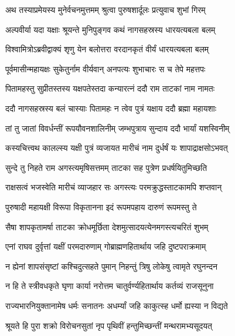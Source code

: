 
\twolineshloka
{अथ तस्याप्रमेयस्य मुनेर्वचनमुत्तमम्}
{श्रुत्वा पुरुषशार्दूलः प्रत्युवाच शुभां गिरम्} %

\twolineshloka
{अल्पवीर्या यदा यक्षाः श्रूयन्ते मुनिपुङ्गव}
{कथं नागसहस्रस्य धारयत्यबला बलम्} %

\twolineshloka
{विश्वामित्रोऽब्रवीद्वाक्यं शृणु येन बलोत्तरा}
{वरदानकृतं वीर्यं धारयत्यबला बलम्} %

\twolineshloka
{पूर्वमासीन्महायक्षः सुकेतुर्नाम वीर्यवान्}
{अनपत्यः शुभाचारः स च तेपे महत्तपः} %

\twolineshloka
{पितामहस्तु सुप्रीतस्तस्य यक्षपतेस्तदा}
{कन्यारत्नं ददौ राम ताटकां नाम नामतः} %

\twolineshloka
{ददौ नागसहस्रस्य बलं चास्याः पितामहः}
{न त्वेव पुत्रं यक्षाय ददौ ब्रह्मा महायशाः} %

\twolineshloka
{तां तु जातां विवर्धन्तीं रूपयौवनशालिनीम्}
{जम्भपुत्राय सुन्दाय ददौ भार्यां यशस्विनीम्} %

\twolineshloka
{कस्यचित्त्वथ कालल्स्य यक्षी पुत्रं व्यजायत}
{मारीचं नाम दुर्धर्षं यः शापाद्राक्षसोऽभवत्} %

\twolineshloka
{सुन्दे तु निहते राम अगस्त्यमृषिसत्तमम्}
{ताटका सह पुत्रेण प्रधर्षयितुमिच्छति} %

\twolineshloka
{राक्षसत्वं भजस्वेति मारीचं व्याजहार सः}
{अगस्त्यः परमक्रुद्धस्ताटकामपि शप्तवान्} %

\twolineshloka
{पुरुषादी महायक्षी विरूपा विकृतानना}
{इदं रूपमपहाय दारुणं रूपमस्तु ते} %

\twolineshloka
{सैषा शापकृतामर्षा ताटका क्रोधमूर्छिता}
{देशमुत्सादयत्येनमगस्त्यचरितं शुभम्} %

\twolineshloka
{एनां राघव दुर्वृत्तां यक्षीं परमदारुणाम्}
{गोब्राह्मणहितार्थाय जहि दुष्टपराक्रमाम्} %

\twolineshloka
{न ह्येनां शापसंसृष्टां कश्चिदुत्सहते पुमान्}
{निहन्तुं त्रिषु लोकेषु त्वामृते रघुनन्दन} %

\twolineshloka
{न हि ते स्त्रीवधकृते घृणा कार्या नरोत्तम}
{चातुर्वर्ण्यहितार्थाय कर्तव्यं राजसूनुना} %

\twolineshloka
{राज्यभारनियुक्तानामेष धर्मः सनातनः}
{अधर्म्यां जहि काकुत्स्ह धर्मो ह्यस्या न विद्यते} %

\twolineshloka
{श्रूयते हि पुरा शक्रो विरोचनसुतां नृप}
{पृथिवीं हन्तुमिच्छन्तीं मन्थरामभ्यसूदयत्} %

